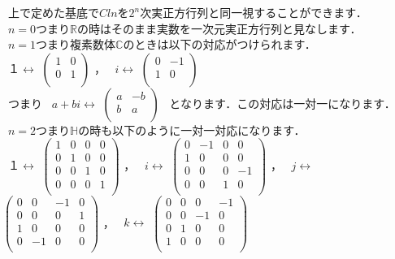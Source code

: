 \documentclass[./main]{subfiles} %
\theoremstyle{idefinition}
\begin{document}
\ 上で定めた基底で$Cln$を$2^n$次実正方行列と同一視することができます．\\
\ $n=0$つまり$\mathbb{R}$の時はそのまま実数を一次元実正方行列と見なします．\\
\ $n=1$つまり複素数体$\mathbb{C}$のときは以下の対応がつけられます．\\

\ $１\leftrightarrow $
$ \begin{pmatrix}
 1 & 0 \\
 0 & 1 \\
\end{pmatrix}  $ ，
\ $i \leftrightarrow $
$ \begin{pmatrix}
 0 & -1 \\
 1 & 0 \\
\end{pmatrix}  $\\
\ つまり
\ $a+bi\leftrightarrow $
$ \begin{pmatrix}
 a & -b \\
 b & a \\
\end{pmatrix}  $
\ となります．この対応は一対一になります．\\

\ $n=2$つまり$\mathbb{H}$の時も以下のように一対一対応になります．\\

\ $１\leftrightarrow $
$ \begin{pmatrix}
 1 & 0 & 0 & 0 \\
 0 & 1 & 0 & 0 \\
 0 & 0 & 1 & 0 \\
 0 & 0 & 0 & 1 \\
\end{pmatrix}  $ ，
\ $i \leftrightarrow $
$ \begin{pmatrix}
 0 & -1 & 0 & 0 \\
 1 & 0 & 0 & 0 \\
 0 & 0 & 0 & -1 \\
 0 & 0 & 1 & 0 \\
\end{pmatrix}  $ ，
\ $j \leftrightarrow $
$ \begin{pmatrix}
 0 & 0 & -1 & 0 \\
 0 & 0 & 0 & 1 \\
 1 & 0 & 0 & 0 \\
 0 & -1 & 0 & 0 \\
\end{pmatrix}  $ ，
\ $k \leftrightarrow $
$ \begin{pmatrix}
 0 & 0 & 0 & -1 \\
 0 & 0 & -1 & 0 \\
 0 & 1 & 0 & 0 \\
 1 & 0 & 0 & 0 \\
\end{pmatrix}  $ \\\\\\\\
\end{document}
